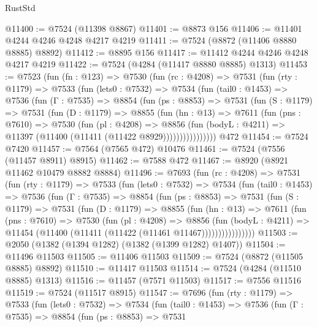 \begin{lexlean}{RustStd}
\begin{coremodule}
@11400 := @7524 (@11398 @8867)
@11401 := @8873 @156
@11406 := @11401 @4244 @4246 @4248 @4217 @4219
@11411 := @7524 (@8872 (@11406 @8880 @8885) @8892)
@11412 := @8895 @156
@11417 := @11412 @4244 @4246 @4248 @4217 @4219
@11422 := @7524 (@4284 (@11417 @8880 @8885) @1313)
@11453 := @7523
    (fun (fn : @123) =>
    @7530
      (fun (rc : @4208) =>
      @7531
        (fun (rty : @1179) =>
        @7533
          (fun (lets0 : @7532) =>
          @7534
            (fun (tail0 : @1453) =>
            @7536
              (fun (Γ : @7535) =>
              @8854
                (fun (ps : @8853) =>
                @7531
                  (fun (S : @1179) =>
                  @7531
                    (fun (D : @1179) =>
                    @8855
                      (fun (hn : @13) =>
                      @7611
                        (fun (pns : @7610) =>
                        @7530
                          (fun (pl : @4208) =>
                          @8856
                            (fun (bodyL : @4211) =>
                            @11397 (@11400 (@11411 (@11422 @8929))))))))))))))))
    @472
@11454 := @7524 @7420
@11457 := @7564 (@7565 @472) @10476
@11461 := @7524 (@7556 (@11457 @8911) @8915)
@11462 := @7588 @472
@11467 := @8920 (@8921 @11462 @10479 @8882 @8884)
@11496 := @7693
    (fun (rc : @4208) =>
    @7531
      (fun (rty : @1179) =>
      @7533
        (fun (lets0 : @7532) =>
        @7534
          (fun (tail0 : @1453) =>
          @7536
            (fun (Γ : @7535) =>
            @8854
              (fun (ps : @8853) =>
              @7531
                (fun (S : @1179) =>
                @7531
                  (fun (D : @1179) =>
                  @8855
                    (fun (hn : @13) =>
                    @7611
                      (fun (pns : @7610) =>
                      @7530
                        (fun (pl : @4208) =>
                        @8856
                          (fun (bodyL : @4211) =>
                          @11454 (@11400 (@11411 (@11422 (@11461 @11467))))))))))))))))
@11503 := @2050 (@1382 (@1394 @1282) (@1382 (@1399 @1282) @1407))
@11504 := @11496 @11503
@11505 := @11406 @11503
@11509 := @7524 (@8872 (@11505 @8885) @8892)
@11510 := @11417 @11503
@11514 := @7524 (@4284 (@11510 @8885) @1313)
@11516 := @11457 (@7571 @11503)
@11517 := @7556 @11516
@11519 := @7524 (@11517 @8915)
@11547 := @7696
    (fun (rty : @1179) =>
    @7533
      (fun (lets0 : @7532) =>
      @7534
        (fun (tail0 : @1453) =>
        @7536
          (fun (Γ : @7535) =>
          @8854
            (fun (ps : @8853) =>
            @7531

\end{coremodule}
\end{lexlean}
